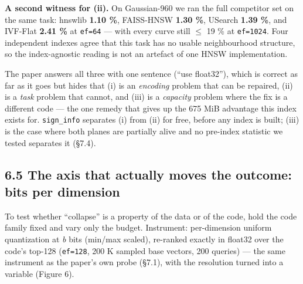 \documentclass[
  10pt,
]{article}
\begin{document}
\textbf{A second witness for (ii).} On Gaussian-960 we ran the full
competitor set on the same task: hnswlib \textbf{1.10 \%}, FAISS-HNSW
\textbf{1.30 \%}, USearch \textbf{1.39 \%}, and IVF-Flat \textbf{2.41
\%} at \texttt{ef=64} --- with every curve still $\leq$ 19 \% at
\texttt{ef=1024}. Four independent indexes agree that this task has no
usable neighbourhood structure, so the index-agnostic reading is not an
artefact of one HNSW implementation.

The paper answers all three with one sentence (``use float32''), which
is correct as far as it goes but hides that (i) is an \emph{encoding}
problem that can be repaired, (ii) is a \emph{task} problem that cannot,
and (iii) is a \emph{capacity} problem where the fix is a different code
--- the one remedy that gives up the 675 MiB advantage this index exists
for. \texttt{sign\_info} separates (i) from (ii) for free, before any
index is built; (iii) is the case where both planes are partially alive
and no pre-index statistic we tested separates it (§7.4).

\subsection{6.5 The axis that actually moves the outcome: bits per
dimension}\label{the-axis-that-actually-moves-the-outcome-bits-per-dimension}

To test whether ``collapse'' is a property of the data or of the code,
hold the code family fixed and vary only the budget. Instrument:
per-dimension uniform quantization at \emph{b} bits (min/max scaled),
re-ranked exactly in float32 over the code's top-128 (\texttt{ef=128},
200 K sampled base vectors, 200 queries) --- the same instrument as the
paper's own probe (§7.1), with the resolution turned into a variable
(Figure 6).
\end{document}
